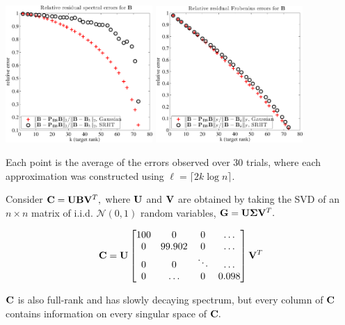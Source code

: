 \documentclass[xcolor=x11names,compress,ignorenonframetext]{beamer}
\renewcommand{\(}{\begin{columns}}
\renewcommand{\)}{\end{columns}}
\newcommand{\<}[1]{\begin{column}{#1}}
\renewcommand{\>}{\end{column}}
\begin{document}
\begin{frame}
\centerline{%
 \includegraphics[width=2.2in, keepaspectratio=true]{experimentB-residual-spectral.pdf}%
 \includegraphics[width=2.2in, keepaspectratio=true]{experimentB-residual-frobenius.pdf}}
 \vspace{1em}
 Each point is the average of the errors observed over 30 trials,
 where each approximation was constructed using $\ell = \lceil 2 k \log n \rceil.$
\end{frame}

\begin{frame}
  
 Consider $\mathbf{C} = \mathbf{U} \mathbf{B} \mathbf{V}^T,$ where $\mathbf{U}$ and $\mathbf{V}$
 are obtained by taking the SVD of an $n \times n$ matrix of i.i.d. $\mathcal{N}(0,1)$ random variables,
 $\mathbf{G} = \mathbf{U} \boldsymbol{\Sigma} \mathbf{V}^T.$
 
\[
 \mathbf{C} = \mathbf{U} \left[ 
          \begin{matrix} 100 &  0     & 0 & \ldots \\
                          0  & 99.902 & 0 & \ldots \\
                          0  & 0      & \ddots & \ldots \\
                          0  & \ldots & 0 & 0.098 
          \end{matrix}
          \right] \mathbf{V}^T
\]

 $\mathbf{C}$ is also full-rank and has slowly decaying spectrum, but every column of $\mathbf{C}$ contains
 information on every singular space of $\mathbf{C}.$
\
\end{frame}
\end{document}
